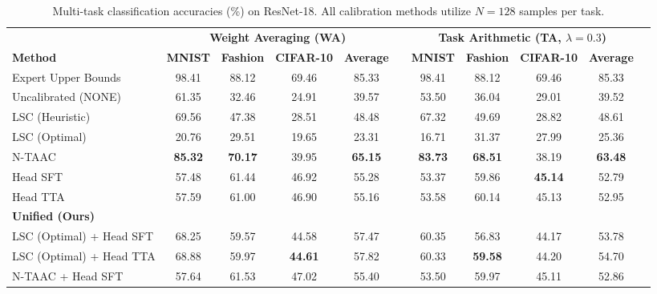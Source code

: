 \documentclass{article}
\theoremstyle{plain}
\theoremstyle{definition}
\theoremstyle{remark}
\begin{document}
\begin{table}[t]
\caption{Multi-task classification accuracies (\%) on ResNet-18. All calibration methods utilize $N=128$ samples per task.}
\label{tab:main_results}
\vskip 0.15in
\begin{center}
\begin{small}
\begin{sc}
\setlength{\tabcolsep}{4.5pt}
\begin{tabular}{lcccccccccc}
\toprule
 & \multicolumn{4}{c}{\textbf{Weight Averaging (WA)}} & & \multicolumn{4}{c}{\textbf{Task Arithmetic (TA, $\lambda=0.3$)}} \\
\cmidrule{2-5} \cmidrule{7-10}
\textbf{Method} & \textbf{MNIST} & \textbf{Fashion} & \textbf{CIFAR-10} & \textbf{Average} & & \textbf{MNIST} & \textbf{Fashion} & \textbf{CIFAR-10} & \textbf{Average} \\
\midrule
Expert Upper Bounds & 98.41 & 88.12 & 69.46 & 85.33 & & 98.41 & 88.12 & 69.46 & 85.33 \\
\midrule
Uncalibrated (NONE) & 61.35 & 32.46 & 24.91 & 39.57 & & 53.50 & 36.04 & 29.01 & 39.52 \\
LSC (Heuristic) & 69.56 & 47.38 & 28.51 & 48.48 & & 67.32 & 49.69 & 28.82 & 48.61 \\
LSC (Optimal) & 20.76 & 29.51 & 19.65 & 23.31 & & 16.71 & 31.37 & 27.99 & 25.36 \\
N-TAAC & \textbf{85.32} & \textbf{70.17} & 39.95 & \textbf{65.15} & & \textbf{83.73} & \textbf{68.51} & 38.19 & \textbf{63.48} \\
Head SFT & 57.48 & 61.44 & 46.92 & 55.28 & & 53.37 & 59.86 & \textbf{45.14} & 52.79 \\
Head TTA & 57.59 & 61.00 & 46.90 & 55.16 & & 53.58 & 60.14 & 45.13 & 52.95 \\
\midrule
\textbf{Unified (Ours)} & & & & & & & & & \\
LSC (Optimal) + Head SFT & 68.25 & 59.57 & 44.58 & 57.47 & & 60.35 & 56.83 & 44.17 & 53.78 \\
LSC (Optimal) + Head TTA & 68.88 & 59.97 & \textbf{44.61} & 57.82 & & 60.33 & \textbf{59.58} & 44.20 & 54.70 \\
N-TAAC + Head SFT & 57.64 & 61.53 & 47.02 & 55.40 & & 53.50 & 59.97 & 45.11 & 52.86 \\
\bottomrule
\end{tabular}
\end{sc}
\end{small}
\end{center}
\vskip -0.1in
\end{table}
\end{document}
